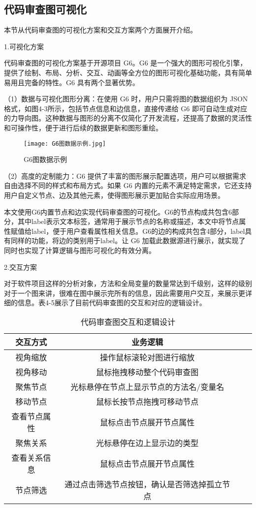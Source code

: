 \subsection{代码审查图可视化}

本节从代码审查图的可视化方案和交互方案两个方面展开介绍。

1.可视化方案 

代码审查图的可视化方案基于开源项目 G6。G6 是一个强大的图形可视化引擎，提供了绘制、布局、分析、交互、动画等全方位的图形可视化基础功能，具有简单易用且完备的特性。G6 具有两个显著优势。

（1）数据与可视化图形分离：在使用 G6 时，用户只需将图的数据组织为 JSON 格式，如图4-3所示，包括节点信息和边信息，直接传递给 G6 即可自动生成对应的力导向图。这种数据与图形的分离不仅简化了开发流程，还提高了数据的灵活性和可操作性，便于进行后续的数据更新和图形重绘。

\begin{figure}[h]
\centering
\texttt{[image: G6图数据示例.jpg]}
\caption{G6图数据示例}
\end{figure}

（2）高度的定制能力：G6 提供了丰富的图形展示配置选项，用户可以根据需求自由选择不同的样式和布局方式。如果 G6 内置的元素不满足特定需求，它还支持用户自定义节点、边及其他元素，使得图形展示更加贴合实际应用场景。

本文使用G6内置节点和边实现代码审查图的可视化。G6的节点构成共包含6部分，其中label表示文本标签，通常用于展示节点的名称或描述，本文中将节点属性赋值给label，便于用户查看属性相关信息。G6的边的构成共包含4部分，label具有同样的功能，将边的类别用于label。让 G6 加载此数据源进行展示，就实现了同时也实现了计算逻辑与图形可视化的有效分离。


2.交互方案

对于软件项目这样的分析对象，方法和全局变量的数量常达到千级别，这样的级别对于一个图来讲，很难在图中展示完所有的信息，因此需要用户交互，来展示更详细的信息。表4-5展示了目前代码审查图的交互和对应的逻辑设计。


\begin{table}[htbp]
\caption{代码审查图交互和逻辑设计}
\vspace{0.5em}\centering\wuhao
\begin{tabular}{cccc}
\toprule
交互方式 & 业务逻辑 \\
\midrule
视角缩放 & 操作鼠标滚轮对图进行缩放  \\
视角移动 & 鼠标拖拽移动整个代码审查图   \\
聚焦节点 & 光标悬停在节点上显示节点的方法名/变量名  \\
移动节点 & 鼠标长按节点拖拽可移动节点 \\
查看节点属性 & 鼠标点击节点展开节点属性  \\
聚焦关系 & 光标悬停在边上显示边的类型  \\
查看关系信息 & 鼠标点击节点展开节点属性  \\
节点筛选 & 通过点击筛选节点按钮，确认是否筛选掉孤立节点 \\
\bottomrule
\end{tabular}
\end{table}



